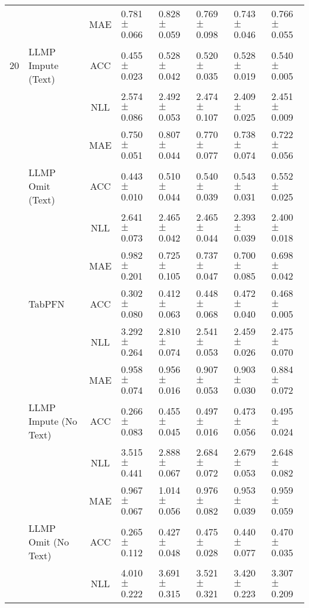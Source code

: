 \begin{table*}[htbp]
\begin{tiny}
\begin{sc}
\begin{adjustbox}{max width=\textwidth}
\begin{tabular}{crclllll}
\cmidrule{2-8}          &       & MAE   & 0.781$\pm$0.066 & 0.828$\pm$0.059 & 0.769$\pm$0.098 & 0.743$\pm$0.046 & 0.766$\pm$0.055 \\
    20    & \multicolumn{1}{l}{LLMP Impute (Text)} & ACC   & 0.455$\pm$0.023 & 0.528$\pm$0.042 & 0.520$\pm$0.035 & 0.528$\pm$0.019 & 0.540$\pm$0.005 \\
          &       & NLL   & 2.574$\pm$0.086 & 2.492$\pm$0.053 & 2.474$\pm$0.107 & 2.409$\pm$0.025 & 2.451$\pm$0.009 \\
\cmidrule{2-8}          &       & MAE   & 0.750$\pm$0.051 & 0.807$\pm$0.044 & 0.770$\pm$0.077 & 0.738$\pm$0.074 & 0.722$\pm$0.056 \\
          & \multicolumn{1}{l}{LLMP Omit (Text)} & ACC   & 0.443$\pm$0.010 & 0.510$\pm$0.044 & 0.540$\pm$0.039 & 0.543$\pm$0.031 & 0.552$\pm$0.025 \\
          &       & NLL   & 2.641$\pm$0.073 & 2.465$\pm$0.042 & 2.465$\pm$0.044 & 2.393$\pm$0.039 & 2.400$\pm$0.018 \\
\cmidrule{2-8}          &       & MAE   & 0.982$\pm$0.201 & 0.725$\pm$0.105 & 0.737$\pm$0.047 & 0.700$\pm$0.085 & 0.698$\pm$0.042 \\
          & \multicolumn{1}{l}{TabPFN} & ACC   & 0.302$\pm$0.080 & 0.412$\pm$0.063 & 0.448$\pm$0.068 & 0.472$\pm$0.040 & 0.468$\pm$0.005 \\
          &       & NLL   & 3.292$\pm$0.264 & 2.810$\pm$0.074 & 2.541$\pm$0.053 & 2.459$\pm$0.026 & 2.475$\pm$0.070 \\
    \midrule
          &       & MAE   & 0.958$\pm$0.074 & 0.956$\pm$0.016 & 0.907$\pm$0.053 & 0.903$\pm$0.030 & 0.884$\pm$0.072 \\
          & \multicolumn{1}{l}{LLMP Impute (No Text)} & ACC   & 0.266$\pm$0.083 & 0.455$\pm$0.045 & 0.497$\pm$0.016 & 0.473$\pm$0.056 & 0.495$\pm$0.024 \\
          &       & NLL   & 3.515$\pm$0.441 & 2.888$\pm$0.067 & 2.684$\pm$0.072 & 2.679$\pm$0.053 & 2.648$\pm$0.082 \\
\cmidrule{2-8}          &       & MAE   & 0.967$\pm$0.067 & 1.014$\pm$0.056 & 0.976$\pm$0.082 & 0.953$\pm$0.039 & 0.959$\pm$0.059 \\
          & \multicolumn{1}{l}{LLMP Omit (No Text)} & ACC   & 0.265$\pm$0.112 & 0.427$\pm$0.048 & 0.475$\pm$0.028 & 0.440$\pm$0.077 & 0.470$\pm$0.035 \\
          &       & NLL   & 4.010$\pm$0.222 & 3.691$\pm$0.315 & 3.521$\pm$0.321 & 3.420$\pm$0.223 & 3.307$\pm$0.209 \\

\end{tabular}
\end{adjustbox}
\end{sc}
\end{tiny}
\end{table*}
